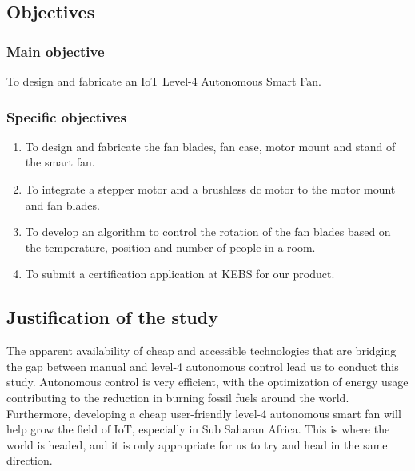 \subsection{Objectives}
\subsubsection{Main objective}

To design and fabricate an \ac{IoT} Level-4 Autonomous Smart Fan.

\subsubsection{Specific objectives}

\begin{enumerate}
	\item To design and fabricate the fan blades, fan case, motor mount and stand of the smart fan. \vspace*{.2cm}
	\item To integrate a stepper motor and a brushless dc motor to the motor mount and fan blades.\vspace*{.2cm}
	\item To develop an algorithm to control the rotation of the fan blades based on the temperature, position and number of people in a room.\vspace*{.2cm}
	\item To submit a certification application at \ac{KEBS} for our product.\vspace*{.2cm}
	

\end{enumerate}


\subsection{Justification of the study}

The apparent availability of cheap and accessible technologies that are bridging the gap between manual and level-4 autonomous control lead us to conduct this study. Autonomous control is very efficient, with the optimization of energy usage contributing to the reduction in burning fossil fuels around the world. Furthermore, developing a cheap user-friendly level-4 autonomous smart fan will help grow the field of \ac{IoT}, especially in Sub Saharan Africa. This is where the world is headed, and it is only appropriate for us to try and head in the same direction. 